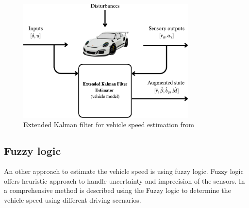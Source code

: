 \begin{figure}[ht]
    \centering
    \includegraphics[width=0.8\textwidth]{images/Extended Kalman Filter Estimator (vehicle model).pdf}
    \caption{Extended Kalman filter for vehicle speed estimation from \cite{lit_model_based_est}}
    \label{fig:model_based}
\end{figure}
\FloatBarrier

\subsection{Fuzzy logic}
An other approach to estimate the vehicle speed is using fuzzy logic. Fuzzy logic offers heuristic approach to handle uncertainty and imprecision of the sensors. In \cite{lit_for_Kalman_fuzzy} a comprehensive method is described using the Fuzzy logic to determine the vehicle speed using different driving scenarios.


